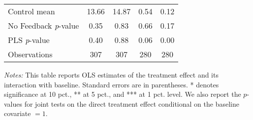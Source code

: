 \begin{table}[ht]
{\begin{threeparttable}
\begin{tabular}{l*{4}{c}}
Control mean    &    13.66         &    14.87         &     0.54         &     0.12         \\
No Feedback \emph{p}-value&     0.35         &     0.83         &     0.66         &     0.17         \\
PLS \emph{p}-value&     0.40         &     0.88         &     0.06         &     0.00         \\
Observations    &      307         &      307         &      280         &      280         \\
\bottomrule \end{tabular} \begin{tablenotes}[flushleft] \footnotesize \item \emph{Notes:} This table reports OLS estimates of the treatment effect and its interaction with baseline. Standard errors are in parentheses. * denotes significance at 10 pct., ** at 5 pct., and *** at 1 pct. level. We also report the \(p\)-values for joint tests on the direct treatment effect conditional on the baseline covariate $= 1$. \end{tablenotes} \end{threeparttable} } \end{table}

